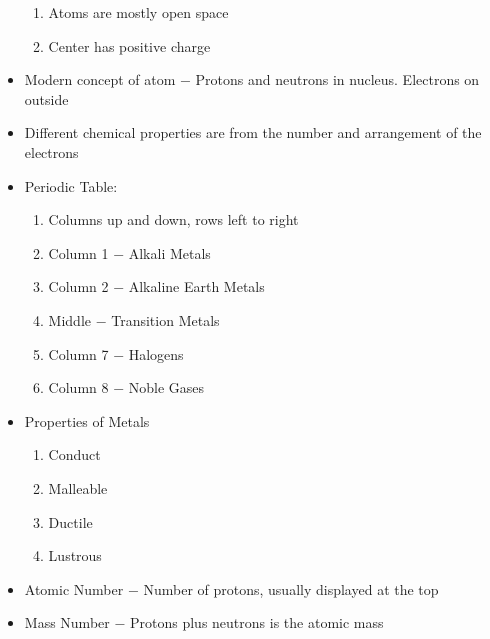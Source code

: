 \documentclass[12pt]{article}
\begin{document}
\begin{itemize}
\begin{enumerate}
      \item Atoms are mostly open space

      \item Center has positive charge

    \end{enumerate}

  \item Modern concept of atom $-$ Protons and neutrons in nucleus. Electrons on outside

  \item Different chemical properties are from the number and arrangement of the electrons

\item Periodic Table:

  \begin{enumerate}

    \item Columns up and down, rows left to right

    \item Column 1 $-$ Alkali Metals

    \item Column 2 $-$ Alkaline Earth Metals

    \item Middle $-$ Transition Metals

    \item Column 7 $-$ Halogens

    \item Column 8 $-$ Noble Gases

  \end{enumerate}

\item Properties of Metals

  \begin{enumerate}

    \item Conduct

    \item Malleable

    \item Ductile

    \item Lustrous
      
  \end{enumerate}

\item Atomic Number $-$ Number of protons, usually displayed at the top

\item Mass Number $-$ Protons plus neutrons is the atomic mass


\end{itemize}
\end{document}
